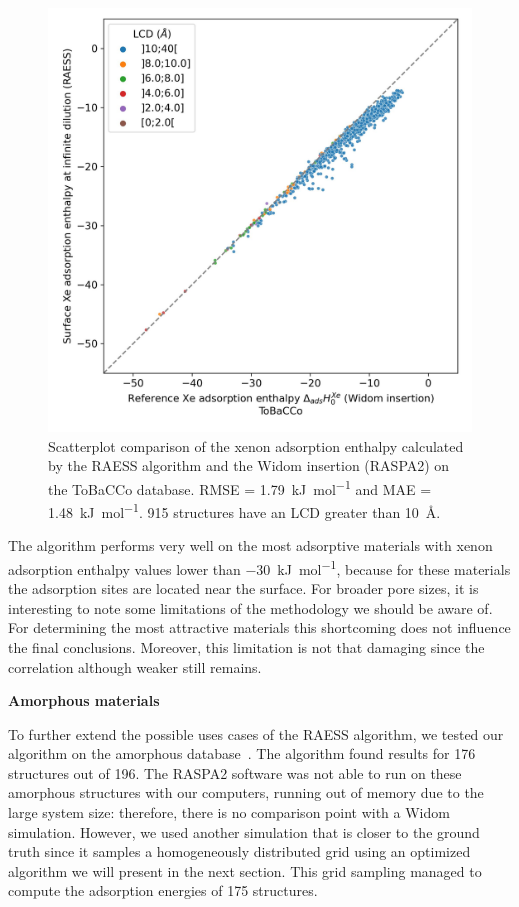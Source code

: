 \documentclass[main]{subfiles}
\begin{document}
\begin{figure}[ht]
\centering
  \includegraphics[width=0.5\linewidth]{figures/3-fastsim/H_Xe_0_widom_vs_Enthalpy_surface_kjmol_overview_tobacco.jpeg}
  \caption{Scatterplot comparison of the xenon adsorption enthalpy calculated by the RAESS algorithm and the Widom insertion (RASPA2) on the ToBaCCo database. RMSE = \SI{1.79}{\kilo\joule\per\mole} and MAE = \SI{1.48}{\kilo\joule\per\mole}. 915 structures have an LCD greater than \SI{10}{\angstrom}.}\label{fgr:tobacco}
\end{figure}

The algorithm performs very well on the most adsorptive materials with xenon adsorption enthalpy values lower than \SI{-30}{\kilo\joule\per\mole}, because for these materials the adsorption sites are located near the surface. For broader pore sizes, it is interesting to note some limitations of the methodology we should be aware of. For determining the most attractive materials this shortcoming does not influence the final conclusions. Moreover, this limitation is not that damaging since the correlation although weaker still remains.


\textbf{Amorphous materials}

To further extend the possible uses cases of the RAESS algorithm, we tested our algorithm on the amorphous database~\cite{Thyagarajan_2020}. The algorithm found results for 176 structures out of 196. The RASPA2 software was not able to run on these amorphous structures with our computers, running out of memory due to the large system size: therefore, there is no comparison point with a Widom simulation. However, we used another simulation that is closer to the ground truth since it samples a homogeneously distributed grid using an optimized algorithm we will present in the next section. This grid sampling managed to compute the adsorption energies of 175 structures. 
\end{document}
